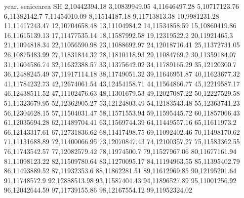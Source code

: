 year,    seaicearea SH
2,10442394.18
3,10839949.05
4,11646497.28
5,10717123.76
6,11382142.7
7,11454010.09
8,11514187.18
9,11713813.38
10,9981231.28
11,11417243.47
12,10704658.48
13,11104984.2
14,11534858.59
15,10860419.86
16,11615139.13
17,11477535.14
18,11587992.58
19,12319522.2
20,11921465.3
21,11094818.34
22,11056590.98
23,11088692.97
24,12018716.41
25,11372731.05
26,10875483.99
27,11831844.32
28,11810118.93
29,11084769.2
30,11359184.07
31,11604586.74
32,11632388.57
33,11375642.02
34,11789165.29
35,12120300.7
36,12488245.49
37,11917114.18
38,11749051.32
39,11646951.87
40,11623677.32
41,11784232.73
42,12674061.54
43,12454158.71
44,11564866.77
45,12219587.17
46,12438511.52
47,11102476.63
48,11301679.53
49,12027087.22
50,12227529.58
51,11323679.95
52,12362905.27
53,12124803.49
54,12183543.48
55,12363741.23
56,12304628.15
57,11504031.47
58,11571553.94
59,11595445.72
60,11857066.43
61,12035694.28
62,11489704.41
63,11569744.39
64,11449557.16
65,11611973.2
66,12143317.61
67,12731836.62
68,11417498.75
69,11092402.46
70,11498170.62
71,11131688.89
72,11400066.95
73,12070847.43
74,12100357.27
75,11583362.55
76,11743542.57
77,12082579.42
78,11974500.7
79,11527967.06
80,11677161.94
81,11098123.22
82,11509780.64
83,11270095.17
84,11194963.55
85,11395402.79
86,11493889.52
87,11932353.6
88,11862281.51
89,11612969.85
90,12195201.64
91,11748572.9
92,12888513.98
93,11587404.43
94,11896527.89
95,11001256.92
96,12042644.59
97,11739155.86
98,12167554.12
99,11952324.02
